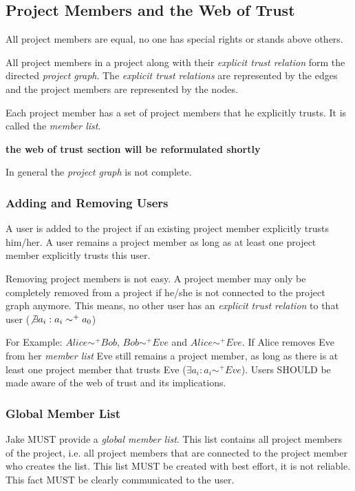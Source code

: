 \subsection{Project Members and the Web of Trust}
All project members are equal, no one has special rights or stands above others.

All project members in a project along with their \emph{explicit trust relation} form the directed \emph{project graph}. The \emph{explicit trust relations} are represented by the edges and the project members are represented by the nodes.

Each project member has a set of project members that he explicitly trusts. It is called the \emph{member list}. 

\textbf{the web of trust section will be reformulated shortly}

In general the \emph{project graph} is not complete.

\subsubsection{Adding and Removing Users}
A user is added to the project if an existing project member explicitly trusts him/her. A user remains a project member as long as at least one project member explicitly trusts this user.

Removing project members is not easy. A project member may only be completely removed from a project if he/she is not connected to the project graph anymore.
This means, no other user has an \emph{explicit trust relation} to that user ($\not\exists a_i: a_i \sim ^+ a_0$)

For Example: $Alice \sim ^+ Bob$, $Bob \sim ^+ Eve$ and $Alice \sim ^+ Eve$. If Alice removes Eve from her \emph{member list}  Eve still remains a project member, as long as there is at least one project member that trusts Eve ($\exists a_i: a_i \sim ^+ Eve$). Users SHOULD be made aware of the web of trust and its implications. 

\subsubsection{Global Member List}
Jake MUST provide a \emph{global member list}. This list contains all project members of the project, i.e. all project members that are connected to the project member who creates the list. This list MUST be created with best effort, it is not reliable. This fact MUST be clearly communicated to the user. 

